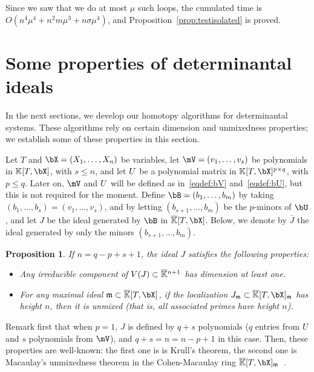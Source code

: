 \documentclass[12pt]{article}
\newtheorem{proposition}[definition]{Proposition}
\begin{document}
Since we saw that we do at most $\mu$ such loops, the cumulated time
is $O(n^4 \mu^4 + n^2 m \mu^3 + n \sigma \mu^4)$, and
Proposition~\ref{prop:testisolated} is proved.


\section{Some properties of determinantal ideals}\label{sec:check}

In the next sections, we develop our homotopy algorithms for
determinantal systems. These algorithms rely on certain dimension and
unmixedness properties; we establish some of these properties in this
section.

Let $T$ and $\bX=(X_1,\dots,X_n)$ be variables, let $\mV=(v_1,\dots,v_s)$ be
polynomials in $\KK[T,\bX]$, with $s \le n$, and let ${U}$ be a polynomial
matrix in $\KK[T,\bX]^{p \times q}$, with $p \le q$. Later on, $\mV$ and ${U}$
will be defined as in~\eqref{eqdef:bV} and~\eqref{eqdef:bU}, but this is not
required for the moment. Define $\bB=(b_1,\dots,b_m)$ by taking $(b_1,\dots,b_s)
= (v_1,\dots,v_s)$, and by letting $(b_{s+1},\dots,b_m)$ be the $p$-minors of
$\bU$, and let $J$ be the ideal generated by $\bB$ in $\KKbar[T,\bX]$. Below, we
denote by $\bar J$ the ideal generated by only the minors
 $(b_{s+1},\dots,b_m)$.
\begin{proposition}\label{prop:KH1H2}
  If $n=q-p+s+1$, the ideal $J$ satisfies the following properties:
\begin{itemize}[leftmargin=8mm]
\item Any irreducible component of $V(J) \subset
  \overline{\mathbb{K}}{}^{n+1}$ has dimension at least one.
\item For any maximal ideal $\m \subset\KKbar[T,\bX]$,
  if the localization $J_\m \subset \KKbar[T,\bX]_\m$ has height $n$,
  then it is unmixed (that is, all associated primes have height $n$).
\end{itemize}
\end{proposition}
Remark first that when $p=1$, $J$ is defined by $q+s$ polynomials ($q$
entries from ${U}$ and $s$ polynomials from $\mV$), and $q+s=n=n-p+1$ in
this case. Then, these properties are well-known: the first one is is
Krull's theorem, the second one is Macaulay's unmixedness theorem in
the Cohen-Macaulay ring
$\KKbar[T,\bX]_\m$~\cite[Corollary~18.14]{Eisenbud95}.
\end{document}
